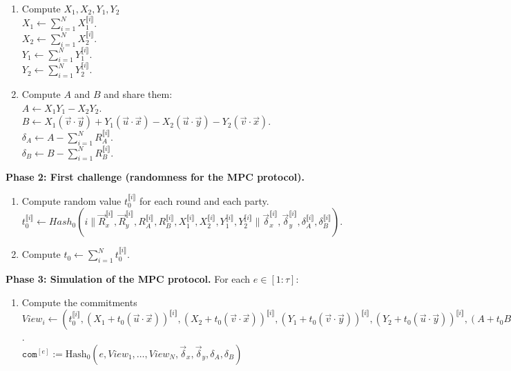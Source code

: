 \documentclass[english]{article}
\newcommand{\lir}{\llbracket i \rrbracket}
\begin{document}
\begin{tcolorbox}[title=Protocol 1: Signature scheme - Signing Algorithm, breakable, enhanced, colback=white, colframe=black]
\begin{enumerate}[label=\arabic*.]
				\item Compute $X_1, X_2, Y_1, Y_2$ \\
				\quad $X_1 \leftarrow \sum_{i=1}^{N} X_1^{\lir}$. \\
				\quad $X_2 \leftarrow \sum_{i=1}^{N} X_2^{\lir}$. \\
				\quad $Y_1 \leftarrow \sum_{i=1}^{N} Y_1^{\lir}$. \\
				\quad $Y_2 \leftarrow \sum_{i=1}^{N} Y_2^{\lir}$.
				
				\item Compute $A$ and $B$ and share them: \\
				\quad $A \leftarrow X_1Y_1 - X_2Y_2$. \\
				\quad $B \leftarrow X_1(\vec{v} \cdot \vec{y}) + Y_1(\vec{u} \cdot \vec{x}) - X_2(\vec{u} \cdot \vec{y}) - Y_2(\vec{v} \cdot \vec{x})$. \\
				\quad $\delta_A \leftarrow A - \sum_{i=1}^{N} R_A^{\lir}$. \\
				\quad $\delta_B \leftarrow B - \sum_{i=1}^{N} R_B^{\lir}$.
			\end{enumerate}
			
			\vspace{0.5em}
			\textbf{Phase 2: First challenge (randomness for the MPC protocol).}
			\begin{enumerate}[label=\arabic*.]
				\item Compute random value $t_0^{\lir}$ for each round and each party. \\
				\quad $t_0^{\lir} \leftarrow Hash_0(
				i \parallel
				\vec{R}_x^{\lir},
				\vec{R}_y^{\lir},
				R_A^{\lir},
				R_B^{\lir},
				X_1^{\lir},
				X_2^{\lir},
				Y_1^{\lir},
				Y_2^{\lir} \parallel
				\vec{\delta}_x^{\lir},
				\vec{\delta}_y^{\lir},
				\delta_A^{\lir},
				\delta_B^{\lir}
				)$.
				
				\item Compute $t_0 \leftarrow \sum_{i=1}^{N} t_0^{\lir}$.
			\end{enumerate}
			
			\vspace{0.5em}
			\textbf{Phase 3: Simulation of the MPC protocol.} For each $e \in [1:\tau]$:
			\begin{enumerate}[label=\arabic*.]
				\item Compute the commitments \\
				\quad $View_i \leftarrow (
				t_0^{\lir},
				(X_1 + t_0(\vec{u} \cdot \vec{x}))^{\lir},
				(X_2 + t_0(\vec{v} \cdot \vec{x}))^{\lir},
				(Y_1 + t_0(\vec{v} \cdot \vec{y}))^{\lir},
				(Y_2 + t_0(\vec{u} \cdot \vec{y}))^{\lir},
				(A + t_0 B)^{\lir}
				)$. \\
				\quad $\texttt{com}^{[e]} := \text{Hash}_0(e, View_1, \dots, View_N, \vec{\delta}_x, \vec{\delta}_y, \delta_A, \delta_B)$
			\end{enumerate}
			

\end{tcolorbox}
\end{document}
